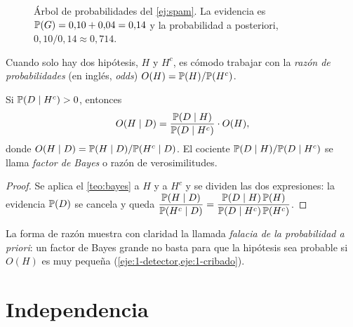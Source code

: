 \begin{figure}[h]
\centering
{}
\caption{Árbol de probabilidades del \cref{ej:spam}. La evidencia es $\mathbb{P}(G)=0{,}10+0{,}04=0{,}14$ y la probabilidad a posteriori, $0{,}10/0{,}14\approx 0{,}714$.}
\label{fig:arbol}
\end{figure}

Cuando solo hay dos hipótesis, $H$ y $H^{c}$, es cómodo trabajar con la \emph{razón de probabilidades} (en inglés, \emph{odds}) $O(H)=\mathbb{P}(H)/\mathbb{P}(H^{c})$.

\begin{proposicion}\label{prop:odds}
Si $\mathbb{P}(D\mid H^{c})>0$, entonces
\[
O(H\mid D)=\frac{\mathbb{P}(D\mid H)}{\mathbb{P}(D\mid H^{c})}\cdot O(H),
\]
donde $O(H\mid D)=\mathbb{P}(H\mid D)/\mathbb{P}(H^{c}\mid D)$. El cociente $\mathbb{P}(D\mid H)/\mathbb{P}(D\mid H^{c})$ se llama \emph{factor de Bayes} o razón de verosimilitudes.
\end{proposicion}

\begin{proof}
Se aplica el \cref{teo:bayes} a $H$ y a $H^{c}$ y se dividen las dos expresiones: la evidencia $\mathbb{P}(D)$ se cancela y queda $\dfrac{\mathbb{P}(H\mid D)}{\mathbb{P}(H^{c}\mid D)}=\dfrac{\mathbb{P}(D\mid H)\,\mathbb{P}(H)}{\mathbb{P}(D\mid H^{c})\,\mathbb{P}(H^{c})}$.
\end{proof}

La forma de razón muestra con claridad la llamada \emph{falacia de la probabilidad a priori}: un factor de Bayes grande no basta para que la hipótesis sea probable si $O(H)$ es muy pequeña (\cref{eje:1-detector,eje:1-cribado}).

\section{Independencia}

